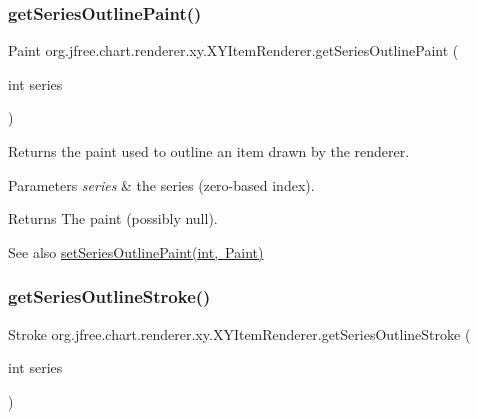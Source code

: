 \subsubsection{\texorpdfstring{get\+Series\+Outline\+Paint()}{getSeriesOutlinePaint()}}
{\footnotesize\ttfamily Paint org.\+jfree.\+chart.\+renderer.\+xy.\+X\+Y\+Item\+Renderer.\+get\+Series\+Outline\+Paint (\begin{DoxyParamCaption}\item[{int}]{series }\end{DoxyParamCaption})}

Returns the paint used to outline an item drawn by the renderer.


\begin{DoxyParams}{Parameters}
{\em series} & the series (zero-\/based index).\\
\hline
\end{DoxyParams}
\begin{DoxyReturn}{Returns}
The paint (possibly {\ttfamily null}).
\end{DoxyReturn}
\begin{DoxySeeAlso}{See also}
\mbox{\hyperlink{interfaceorg_1_1jfree_1_1chart_1_1renderer_1_1xy_1_1_x_y_item_renderer_a4d95cde662d19b7a5d28210264336549}{set\+Series\+Outline\+Paint(int, Paint)}} 
\end{DoxySeeAlso}
\mbox{\label{interfaceorg_1_1jfree_1_1chart_1_1renderer_1_1xy_1_1_x_y_item_renderer_a59b1beb337bddb75e4d43e5f26295244}} 
\subsubsection{\texorpdfstring{get\+Series\+Outline\+Stroke()}{getSeriesOutlineStroke()}}
{\footnotesize\ttfamily Stroke org.\+jfree.\+chart.\+renderer.\+xy.\+X\+Y\+Item\+Renderer.\+get\+Series\+Outline\+Stroke (\begin{DoxyParamCaption}\item[{int}]{series }\end{DoxyParamCaption})}

